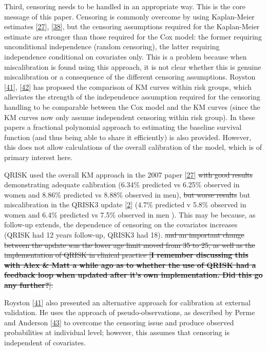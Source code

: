 \documentclass[12pt,PhD,twoside,openright]{muthesis}
\begin{document}
Third, censoring needs to be handled in an appropriate way. This is the core message of this paper. Censoring is commonly overcome by using Kaplan-Meier estimates {[}\protect\hyperlink{ref-hippisley-cox_derivation_2007}{27}{]}, {[}\protect\hyperlink{ref-royston_external_2013}{38}{]}, but the censoring assumptions required for the Kaplan-Meier estimate are stronger than those required for the Cox model: the former requiring unconditional independence (random censoring), the latter requiring independence conditional on covariates only. This is a problem because when miscalibration is found using this approach, it is not clear whether this is genuine miscalibration or a consequence of the different censoring assumptions. Royston {[}\protect\hyperlink{ref-royston_tools_2014}{41}{]}, {[}\protect\hyperlink{ref-royston_tools_2015}{42}{]} has proposed the comparison of KM curves within risk groups, which alleviates the strength of the independence assumption required for the censoring handling to be comparable between the Cox model and the KM curves (since the KM curves now only assume independent censoring within risk group). In these papers a fractional polynomial approach to estimating the baseline survival function (and thus being able to share it efficiently) is also provided. However, this does not allow calculations of the overall calibration of the model, which is of primary interest here.

QRISK used the overall KM approach in the 2007 paper {[}\protect\hyperlink{ref-hippisley-cox_derivation_2007}{27}{]} \sout{with good results} demonstrating adequate calibration (6.34\% predicted vs 6.25\% observed in women and 8.86\% predicted vs 8.88\% observed in men), \sout{but worse results} but miscalibration in the QRISK3 update {[}\protect\hyperlink{ref-hippisley-cox_development_2017}{2}{]} (4.7\% predicted v 5.8\% observed in women and 6.4\% predicted vs 7.5\% observed in men ). This may be because, as follow-up extends, the dependence of censoring on the covariates increases (QRISK had 12 years follow-up, QRISK3 had 18). \sout{and an important change between the update was the lower age limit moved from 35 to 25, as well as the implementation of QRISK in clinical practice {[}\textbf{I remember discussing this with Alex \& Matt a while ago as to whether the use of QRISK had a feedback loop when updated after it's own implementation. Did this go any further?}{]}.}

Royston {[}\protect\hyperlink{ref-royston_tools_2014}{41}{]} also presented an alternative approach for calibration at external validation. He uses the approach of pseudo-observations, as described by Perme and Anderson {[}\protect\hyperlink{ref-perme_checking_2008}{43}{]} to overcome the censoring issue and produce observed probabilities at individual level; however, this assumes that censoring is independent of covariates.
\end{document}
